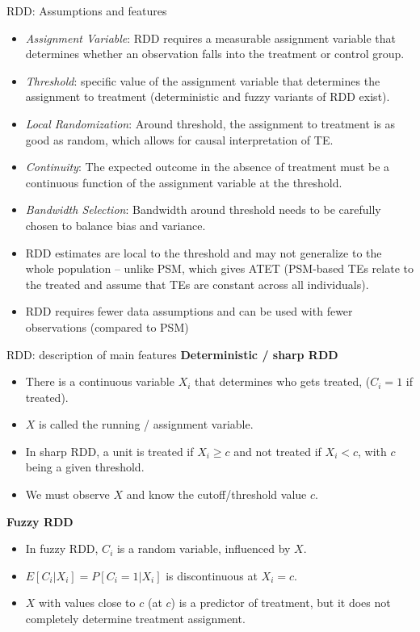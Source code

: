 \documentclass{beamer}
\begin{document}
\begin{frame}{RDD: Assumptions and features}
 \footnotesize  
\begin{itemize}
    \item \emph{Assignment Variable}: RDD requires a measurable assignment variable that determines whether an observation falls into the treatment or control group.
    \item \emph{Threshold}: specific value of the assignment variable that determines the assignment to treatment (deterministic and fuzzy variants of RDD exist).
    \item \emph{Local Randomization}: Around threshold, the assignment to treatment is as good as random, which allows for causal interpretation of TE.
    \item \emph{Continuity}: The expected outcome in the absence of treatment must be a continuous function of the assignment variable at the threshold.
    \item \emph{Bandwidth Selection}: Bandwidth around threshold needs to be carefully chosen to balance bias and variance.
    \bigskip
    \item RDD estimates are local to the threshold and may not generalize to the whole population -- unlike PSM, which gives ATET (PSM-based TEs relate to the treated and assume that TEs are constant across all individuals).
    \item RDD requires fewer data assumptions and can be used with fewer observations (compared to PSM) 
\end{itemize}
    
\end{frame}
\begin{frame}{RDD: description of main features}
\textbf{Deterministic / sharp RDD}\\ \smallskip
\begin{itemize}
    \item There is a continuous variable $X_i$ that determines who gets treated, ($C_i = 1$ if treated). 
    \item $X$ is called the running / assignment variable.
    \item In sharp RDD, a unit is treated if $X_i \geq c$ and not treated if $X_i < c$, with $c$ being a given threshold.
    \item We must observe $X$ and know the cutoff/threshold value $c$.
\end{itemize}
\bigskip
\textbf{Fuzzy RDD}\\ \smallskip
\begin{itemize}
    \item In fuzzy RDD, $C_i$ is a random variable, influenced by $X$.
    \item $E[C_i|X_i] = P[C_i=1|X_i]$ is discontinuous at $X_i = c$.
    \item $X$ with values close to $c$ (at $c$) is a predictor of treatment, but it does not completely determine treatment assignment.
\end{itemize}
\end{frame}
\end{document}
